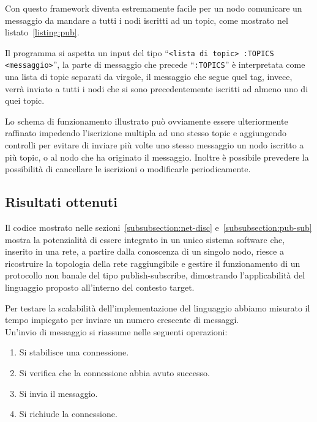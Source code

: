 \documentclass[]{article}
\begin{document}



Con questo framework diventa estremamente facile per un nodo comunicare un messaggio da mandare a tutti i nodi iscritti ad un topic, come mostrato nel listato~\ref{listing:pub}.

Il programma si aspetta un input del tipo ``\texttt{<lista di topic> :TOPICS <messaggio>}'', la parte di messaggio che precede ``\texttt{:TOPICS}'' è interpretata come una lista di topic separati da virgole, il messaggio che segue quel tag, invece, verrà inviato a tutti i nodi che si sono precedentemente iscritti ad almeno uno di quei topic.



Lo schema di funzionamento illustrato può ovviamente essere ulteriormente raffinato impedendo l'iscrizione multipla ad uno stesso topic e aggiungendo controlli per evitare di inviare più volte uno stesso messaggio un nodo iscritto a più topic, o al nodo che ha originato il messaggio. Inoltre è possibile prevedere la possibilità di cancellare le iscrizioni o modificarle periodicamente.

\subsection{Risultati ottenuti}\label{subsection:risultati}

Il codice mostrato nelle sezioni~\ref{subsubsection:net-disc} e~\ref{subsubsection:pub-sub} mostra la potenzialità di essere integrato in un unico sistema software che, inserito in una rete, a partire dalla conoscenza di un singolo nodo, riesce a ricostruire la topologia della rete raggiungibile e gestire il funzionamento di un protocollo non banale del tipo publish-subscribe, dimostrando l'applicabilità del linguaggio proposto all'interno del contesto target. 

Per testare la scalabilità dell'implementazione del linguaggio abbiamo misurato il tempo impiegato per inviare un numero crescente di messaggi.\\
Un'invio di messaggio si riassume nelle seguenti operazioni:
\begin{enumerate}
	\item Si stabilisce una connessione.
	\item{Si verifica che la connessione abbia avuto successo.}
	\item Si invia il messaggio. 
	\item Si richiude la connessione.
\end{enumerate}
\end{document}
